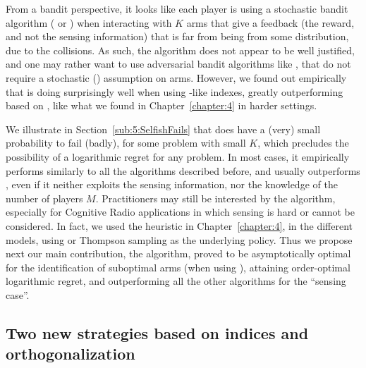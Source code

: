 From a bandit perspective, it looks like each player is using a stochastic bandit algorithm (\UCB{} or \klUCB) when interacting with $K$ arms that give a feedback (the reward, and not the sensing information) that is far from being \iid{} from some distribution, due to the collisions.
%
As such, the algorithm does not appear to be well justified, and one may rather want to use adversarial bandit algorithms like \ExpThree{} \citep{Auer02NonStochastic}, that do not require a stochastic (\iid) assumption on arms.
%
However, we found out empirically that \Selfish{} is doing surprisingly well when using \UCB-like indexes, greatly outperforming \Selfish{} based on \ExpThree,
like what we found in Chapter~\ref{chapter:4} in harder settings.

We illustrate in Section~\ref{sub:5:SelfishFails} that \Selfish{} does have a (very) small probability to fail (badly), for some problem with small $K$,
which precludes the possibility of a logarithmic regret for any problem.
In most cases, it empirically performs similarly to all the algorithms described before,
and usually outperforms \rhoRand,
even if it neither exploits the sensing information, nor the knowledge of the number of players $M$.
%
Practitioners may still be interested by the algorithm, especially for Cognitive Radio applications in which sensing is hard or cannot be considered.
In fact, we used the \Selfish{} heuristic in Chapter~\ref{chapter:4}, in the different models, using \UCB{} or Thompson sampling as the underlying policy.
%
Thus we propose next our main contribution, the \MCTopM{} algorithm, proved to be asymptotically optimal for the identification of suboptimal arms (when using \klUCB), attaining order-optimal logarithmic regret, and outperforming all the other algorithms for the ``sensing case''.



\subsection{Two new strategies based on indices and orthogonalization}
\label{sub:5:RandTopM_and_MCTopM}

